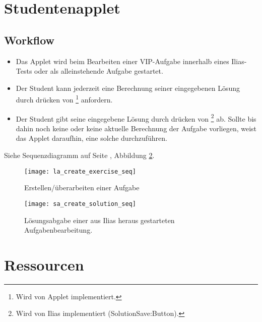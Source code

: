 \documentclass[12pt,a4paper]{article}
\newcommand{\button}[1]{\fbox{\texttt{#1}}}
\begin{document}
\section{Studentenapplet}
\subsection{Workflow}
\begin{itemize}
  \item Das Applet wird beim Bearbeiten einer VIP-Aufgabe innerhalb eines Ilias-Tests
    oder als alleinstehende Aufgabe gestartet.
  \item Der Student kann jederzeit eine Berechnung seiner eingegebenen Lösung
    durch drücken von \button{berechnen}\footnote{Wird von Applet
    implementiert.} anfordern.
  \item Der Student gibt seine eingegebene Lösung durch drücken von
    \button{weiter}\footnote{Wird von Ilias implementiert
    (SolutionSave:Button).} ab. Sollte bis dahin noch keine oder keine aktuelle
    Berechnung der Aufgabe vorliegen, weist das Applet daraufhin, eine solche
    durchzuführen.
\end{itemize}
Siehe Sequenzdiagramm auf Seite \pageref{seq:sa_create_solution_seq}, Abbildung \ref{seq:sa_create_solution_seq}.

\begin{figure}[p]
  \texttt{[image: la\_create\_exercise\_seq]}
  \caption{\label{seq:la_create_exercise}Erstellen/überarbeiten einer Aufgabe}
\end{figure}

\begin{figure}[p]
  \texttt{[image: sa\_create\_solution\_seq]}
  \caption{\label{seq:sa_create_solution_seq}Lösungsabgabe einer aus Ilias
  heraus gestarteten Aufgabenbearbeitung.}
\end{figure}

\section{Ressourcen}
\end{document}

